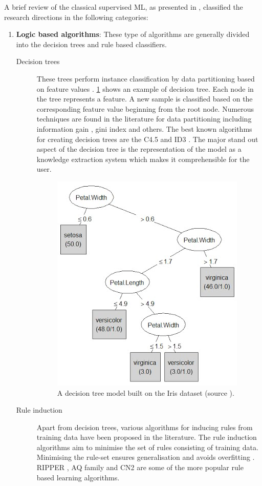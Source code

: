 A brief review of the classical supervised ML, as presented in \citet{kotsiantis2007supervised}, classified the research directions in the following categories:
\begin{enumerate}
	\item \textbf{Logic based algorithms}: These type of algorithms are generally divided into the decision trees and rule based classifiers.
		\begin{description}
			\item[Decision trees] These trees perform instance classification by data partitioning based on feature values \citep{murthy1998automatic}. \figurename \ref{fig:decision_tree} shows an example of decision tree. Each node in the tree represents a feature. A new sample is classified based on the corresponding feature value beginning from the root node. Numerous techniques are found in the literature for data partitioning including information gain \citep{quinlan1986induction}, gini index and others. The best known algorithms for creating decision trees are the C4.5 \citep{quinlan2014c4} and ID3 \citep{quinlan1986induction}. The major stand out aspect of the decision tree is the representation of the model as a knowledge extraction system which makes it comprehensible for the user.     
			\begin{figure}
				\centering
				\includegraphics[width=0.5\linewidth]{fig/ml/decision_tree.JPG}
				\caption{A decision tree model built on the Iris dataset \citep{fisher1936use} (source \citet{decisiontree2015}).}
				\label{fig:decision_tree}
			\end{figure}
			\item[Rule induction] Apart from decision trees, various algorithms for inducing rules from training data have been proposed in the literature. The rule induction algorithms aim to minimise the set of rules consisting of training data. Minimising the rule-set ensures generalisation and avoids overfitting \citep{kotsiantis2007supervised}. RIPPER \citep{cohen1995fast}, AQ family \citep{michalski1980learning} and CN2 \citep{clark1989cn2} are some of the more popular rule based learning algorithms.
		\end{description}
		

\end{enumerate}
